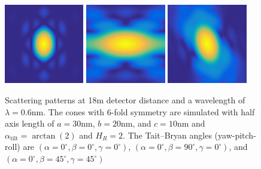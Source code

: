 \begin{figure}[htb]
\includegraphics[width=0.31\textwidth]{../images/form_factor/oriented_primitive_opbjects/cone6_0_0_0_18m.png} \hfill
\includegraphics[width=0.31\textwidth]{../images/form_factor/oriented_primitive_opbjects/cone6_0_90_0_18m.png}  \hfill \includegraphics[width=0.31\textwidth]{../images/form_factor/oriented_primitive_opbjects/cone6_0_45_45_18m.png}
\caption{Scattering patterns at 18m detector distance and a wavelength of $\lambda=0.6$nm. The cones with 6-fold symmetry are simulated with half axis length of $a=30$nm, $b=20$nm, and $c=10$nm and $\alpha_\mathrm{tilt}=\arctan(2)$ and $H_R=2$. The Tait–Bryan angles (yaw-pitch-roll) are $(\alpha=0^\circ,\beta=0^\circ,\gamma=0^\circ)$, $(\alpha=0^\circ,\beta=90^\circ,\gamma=0^\circ)$, and $(\alpha=0^\circ,\beta=45^\circ,\gamma=45^\circ)$ }
\label{fig:opo_coneIQ2D}
\end{figure}

